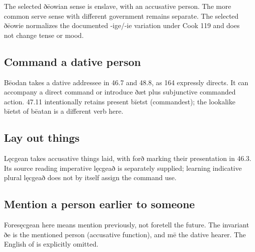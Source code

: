 The selected ðēowian sense is enslave, with an accusative person. The more common serve sense with different government remains separate. The selected ðēowie normalizes the documented -ige/\allowbreak{}-ie variation under Cook 119 and does not change tense or mood.

\subsection*{Command a dative person}

Bēodan takes a dative addressee in 46.7 and 48.8, as 164 expressly directs. It can accompany a direct command or introduce ðæt plus subjunctive commanded action. 47.11 intentionally retains present bīetst (commandest); the lookalike bīetst of bēatan is a different verb here.

\subsection*{Lay out things}

Lęcgean takes accusative things laid, with forð marking their presentation in 46.3. Its source reading imperative lęcgeað is separately supplied; learning indicative plural lęcgeað does not by itself assign the command use.

\subsection*{Mention a person earlier to someone}

Foresęcgean here means mention previously, not foretell the future. The invariant ðe is the mentioned person (accusative function), and mē the dative hearer. The English of is explicitly omitted.

